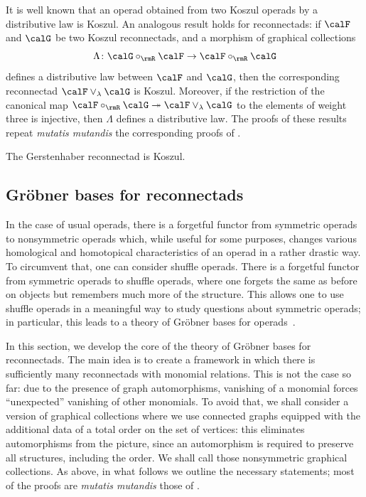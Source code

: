 It is well known that an operad obtained from two Koszul operads by a distributive law is Koszul. An analogous result holds for reconnectads: if $\calF$ and $\calG$ be two Koszul reconnectads, and a morphism of graphical collections
\[
    \Lambda\colon \calG \circ_{\rmR} \calF \rightarrow \calF \circ_{\rmR} \calG
\]
defines a distributive law between $\calF$ and $\calG$, then the corresponding reconnectad $\calF\vee_{\lambda}\calG$ is Koszul. Moreover, if the restriction of the canonical map $\calF\circ_{\rmR}\calG\twoheadrightarrow \calF\vee_{\lambda}\calG$ to the elements of weight three is injective, then $\Lambda$ defines a distributive law. The proofs of these results repeat \emph{mutatis mutandis} the corresponding proofs of \cite[Sec.~8.6]{MR2954392}.

\begin{coro}
The Gerstenhaber reconnectad is Koszul.
\end{coro}

\subsection{Gr\"obner bases for reconnectads}\label{sec:shuffle}

In the case of usual operads, there is a forgetful functor from symmetric operads to nonsymmetric operads which, while useful for some purposes, changes various homological and homotopical characteristics of an operad in a rather drastic way. To circumvent that, one can consider shuffle operads. There is a forgetful functor from symmetric operads to shuffle operads, where one forgets the same as before on objects but remembers much more of the structure. This allows one to use shuffle operads in a meaningful way to study questions about symmetric operads; in particular, this leads to a theory of Gr\"obner bases for operads~\cite{MR2667136}. 

In this section, we develop the core of the theory of Gr\"obner bases for reconnectads. The main idea is to create a framework in which there is sufficiently many reconnectads with monomial relations. This is not the case so far: due to the presence of graph automorphisms, vanishing of a monomial forces ``unexpected'' vanishing of other monomials. To avoid that, we shall consider a version of graphical collections where we use connected graphs equipped with the additional data of a total order on the set of vertices: this eliminates automorphisms from the picture, since an automorphism is required to preserve all structures, including the order.  
We shall call those nonsymmetric graphical collections. As above, in what follows we outline the necessary statements; most of the proofs are \emph{mutatis mutandis} those of \cite[Sec.~8.2]{MR2954392}.

